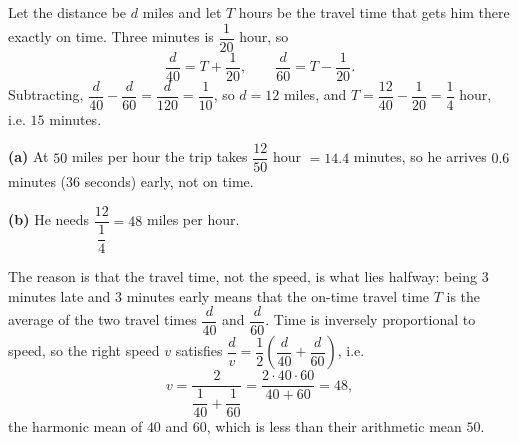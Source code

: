 Let the distance be $d$ miles and let $T$ hours be the travel time that gets him there exactly on time. Three minutes is $\dfrac{1}{20}$ hour, so
\[\dfrac{d}{40}=T+\dfrac{1}{20},\qquad\dfrac{d}{60}=T-\dfrac{1}{20}.\]
Subtracting, $\dfrac{d}{40}-\dfrac{d}{60}=\dfrac{d}{120}=\dfrac{1}{10}$, so $d=12$ miles, and $T=\dfrac{12}{40}-\dfrac{1}{20}=\dfrac14$ hour, i.e. $15$ minutes.

\textbf{(a)} At $50$ miles per hour the trip takes $\dfrac{12}{50}$ hour $=14.4$ minutes, so he arrives $0.6$ minutes ($36$ seconds) early, not on time.

\textbf{(b)} He needs $\dfrac{12}{\dfrac14}=\boxed{48}$ miles per hour.

The reason is that the travel time, not the speed, is what lies halfway: being $3$ minutes late and $3$ minutes early means that the on-time travel time $T$ is the average of the two travel times $\dfrac{d}{40}$ and $\dfrac{d}{60}$. Time is inversely proportional to speed, so the right speed $v$ satisfies $\dfrac dv=\dfrac12\left(\dfrac{d}{40}+\dfrac{d}{60}\right)$, i.e.
\[v=\dfrac{2}{\dfrac{1}{40}+\dfrac{1}{60}}=\dfrac{2\cdot40\cdot60}{40+60}=48,\]
the harmonic mean of $40$ and $60$, which is less than their arithmetic mean $50$.

